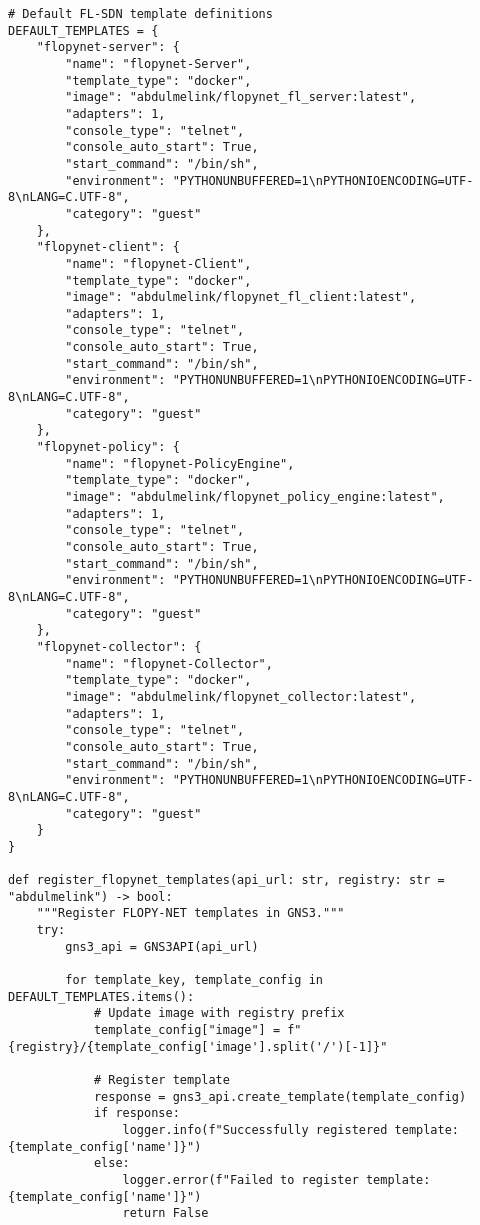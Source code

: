 \begin{lstlisting}[style=pythoncode, caption=GNS3 Template Utilities]
# Default FL-SDN template definitions
DEFAULT_TEMPLATES = {
    "flopynet-server": {
        "name": "flopynet-Server",
        "template_type": "docker", 
        "image": "abdulmelink/flopynet_fl_server:latest",
        "adapters": 1,
        "console_type": "telnet",
        "console_auto_start": True,
        "start_command": "/bin/sh",
        "environment": "PYTHONUNBUFFERED=1\nPYTHONIOENCODING=UTF-8\nLANG=C.UTF-8",
        "category": "guest"
    },
    "flopynet-client": {
        "name": "flopynet-Client",
        "template_type": "docker",
        "image": "abdulmelink/flopynet_fl_client:latest",
        "adapters": 1,
        "console_type": "telnet",
        "console_auto_start": True,
        "start_command": "/bin/sh",
        "environment": "PYTHONUNBUFFERED=1\nPYTHONIOENCODING=UTF-8\nLANG=C.UTF-8",
        "category": "guest"
    },
    "flopynet-policy": {
        "name": "flopynet-PolicyEngine",
        "template_type": "docker",
        "image": "abdulmelink/flopynet_policy_engine:latest",
        "adapters": 1,
        "console_type": "telnet",
        "console_auto_start": True,
        "start_command": "/bin/sh",
        "environment": "PYTHONUNBUFFERED=1\nPYTHONIOENCODING=UTF-8\nLANG=C.UTF-8",
        "category": "guest"
    },
    "flopynet-collector": {
        "name": "flopynet-Collector",
        "template_type": "docker",
        "image": "abdulmelink/flopynet_collector:latest",
        "adapters": 1,
        "console_type": "telnet",
        "console_auto_start": True,
        "start_command": "/bin/sh",
        "environment": "PYTHONUNBUFFERED=1\nPYTHONIOENCODING=UTF-8\nLANG=C.UTF-8",
        "category": "guest"
    }
}

def register_flopynet_templates(api_url: str, registry: str = "abdulmelink") -> bool:
    """Register FLOPY-NET templates in GNS3."""
    try:
        gns3_api = GNS3API(api_url)
        
        for template_key, template_config in DEFAULT_TEMPLATES.items():
            # Update image with registry prefix
            template_config["image"] = f"{registry}/{template_config['image'].split('/')[-1]}"
            
            # Register template
            response = gns3_api.create_template(template_config)
            if response:
                logger.info(f"Successfully registered template: {template_config['name']}")
            else:
                logger.error(f"Failed to register template: {template_config['name']}")
                return False
                

\end{lstlisting}
